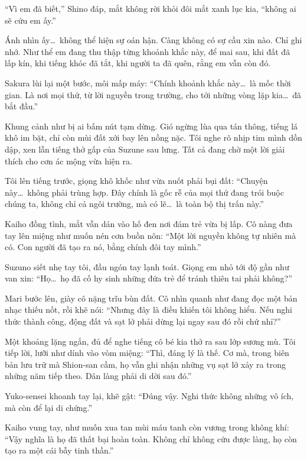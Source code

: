 \documentclass[../main.tex]{subfiles}
\begin{document}
``Vì em đã biết,'' Shino đáp, mắt không rời khỏi đôi mắt xanh lục kia, ``không ai sẽ cứu em ấy.''

Ánh nhìn ấy\dots\ không thể hiện sự oán hận. Càng không có sự cầu xin nào. Chỉ ghi nhớ. Như thể em đang thu thập từng khoảnh khắc này, để mai sau, khi đất đã lấp kín, khi tiếng khóc đã tắt, khi người ta đã quên, rằng em vẫn còn đó.

Sakura lùi lại một bước, môi mấp máy: ``Chính khoảnh khắc này\dots\ là mốc thời gian. Là nơi mọi thứ, từ lời nguyền trong trường, cho tới những vòng lặp kia\dots\ đã bắt đầu.''

Khung cảnh như bị ai bấm nút tạm dừng. Gió ngừng lùa qua tán thông, tiếng lá khô im bặt, chỉ còn mùi đất xới bay lên nồng nặc. Tôi nghe rõ nhịp tim mình dồn dập, xen lẫn tiếng thở gấp của Suzune sau lưng. Tất cả đang chờ một lời giải thích cho cơn ác mộng vừa hiện ra.

Tôi lên tiếng trước, giọng khô khốc như vừa nuốt phải bụi đất: ``Chuyện này\dots\ không phải trùng hợp. Đây chính là gốc rễ của mọi thứ đang trói buộc chúng ta, không chỉ cả ngôi trường, mà có lẽ\dots\ là toàn bộ thị trấn này.''

Kaiho đồng tình, mắt vẫn dán vào hố đen nơi đám trẻ vừa bị lấp. Cô nàng đưa tay lên miệng như muốn nén cơn buồn nôn: ``Một lời nguyền không tự nhiên mà có. Con người đã tạo ra nó, bằng chính đôi tay mình.''

Suzuno siết nhẹ tay tôi, đầu ngón tay lạnh toát. Giọng em nhỏ tới độ gần như van xin: ``Họ\dots\ họ đã cố hy sinh những đứa trẻ để tránh thiên tai phải không?''

Mari bước lên, giày cô nặng trĩu bùn đất. Cô nhìn quanh như đang đọc một bản nhạc thiếu nốt, rồi khẽ nói: ``Nhưng đây là điều khiến tôi không hiểu. Nếu nghi thức thành công, động đất và sạt lở phải dừng lại ngay sau đó rồi chứ nhỉ?''

Một khoảng lặng ngắn, đủ để nghe tiếng cô bé kia thở ra sau lớp sương mù. Tôi tiếp lời, lưỡi như dính vào vòm miệng: ``Thì, đáng lý là thế. Cơ mà, trong biên bản lưu trữ mà Shion-san cầm, họ vẫn ghi nhận những vụ sạt lở xảy ra trong những năm tiếp theo. Dân làng phải di dời sau đó.''

Yuko-sensei khoanh tay lại, khẽ gật: ``Đúng vậy. Nghi thức không những vô ích, mà còn để lại di chứng.''

Kaiho vung tay, như muốn xua tan mùi máu tanh còn vương trong không khí: ``Vậy nghĩa là họ đã thất bại hoàn toàn. Không chỉ không cứu được làng, họ còn tạo ra một cái bẫy tinh thần.''
\end{document}
